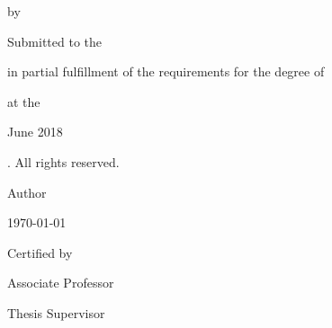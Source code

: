 \documentclass[
  12pt, %
  twoside, %
  english, %
  onehalfspacing, %
]{setting} %
\begin{document}
\begin{titlepage}
  \begin{center} 
    {\Large \bfseries \ttitle \par}
    \bigskip
    {\normalsize by \par}
    \bigskip
    {\large \authorname \par}
    \bigskip
    {\normalsize Submitted to the \deptname \par in partial fulfillment of the requirements for the degree of \par}
    \bigskip
    {\large \degreename \par}
    \bigskip    
    {at the \par}
    \bigskip
    {\large \MakeUppercase{\univname} \par}
    \bigskip
    {\normalsize June 2018 \par}
    \bigskip
    {\textcopyright \space \univname {}. All rights reserved. \par}
    \bigskip \bigskip \bigskip 
    \begin{flushleft}
      {\large Author \dotfill \par}
    \end{flushleft}
    \begin{flushright} 
      {\deptname \par \today \par}
    \end{flushright}
    \begin{flushleft}
      {\large Certified by \dotfill \par}
    \end{flushleft}
    \begin{flushright} 
      {\supname \par Associate Professor \par Thesis Supervisor \par}
    \end{flushright}
  \end{center}
\end{titlepage}
\end{document}
